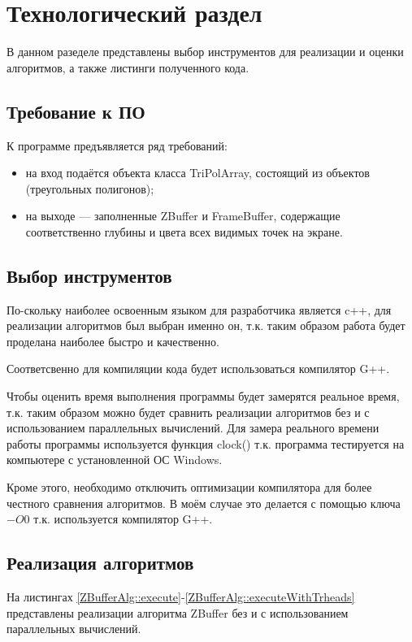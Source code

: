 \chapter{Технологический раздел}
В данном разеделе представлены выбор инструментов для реализации и оценки алгоритмов, а также листинги полученного кода.

\section{Требование к ПО}

К программе предъявляется ряд требований:

\begin{itemize}
	\item на вход подаётся объекта класса TriPolArray, состоящий из объектов (треугольных полигонов);
	\item на выходе — заполненные ZBuffer и FrameBuffer, содержащие соответственно глубины и цвета всех видимых точек на экране.
\end{itemize}

\section{Выбор инструментов}
По-скольку наиболее освоенным языком для разработчика является c++, для реализации алгоритмов был выбран именно он, т.к. таким образом работа будет проделана наиболее быстро и качественно.

Соответсвенно для компиляции кода будет использоваться компилятор G++.

Чтобы оценить время выполнения программы будет замерятся реальное время, т.к. таким образом можно будет сравнить реализации алгоритмов без и с использованием параллельных вычислений. Для замера реального времени работы программы используется функция clock() т.к. программа тестируется на компьютере с установленной ОС Windows. \cite{clock()}

Кроме этого, необходимо отключить оптимизации компилятора для более честного сравнения алгоритмов. В моём случае это делается с помощью ключа $-O0$ т.к. используется компилятор G++. \cite{optimization}

\section{Реализация алгоритмов}
На листингах \ref{ZBufferAlg::execute}-\ref{ZBufferAlg::executeWithTrheads} представлены реализации алгоритма ZBuffer без и с использованием параллельных вычислений.

